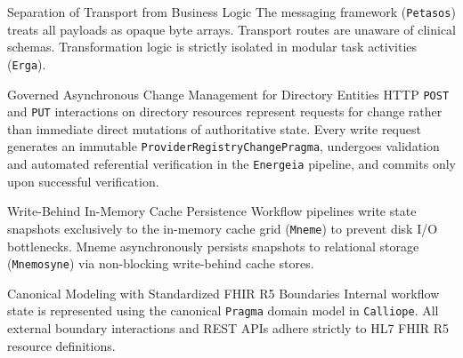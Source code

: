 \begin{principlebox}{Separation of Transport from Business Logic}
The messaging framework (\texttt{Petasos}) treats all payloads as opaque byte arrays. Transport routes are unaware of clinical schemas. Transformation logic is strictly isolated in modular task activities (\texttt{Erga}).
\end{principlebox}

\begin{principlebox}{Governed Asynchronous Change Management for Directory Entities}
HTTP \texttt{POST} and \texttt{PUT} interactions on directory resources represent requests for change rather than immediate direct mutations of authoritative state. Every write request generates an immutable \texttt{ProviderRegistryChangePragma}, undergoes validation and automated referential verification in the \texttt{Energeia} pipeline, and commits only upon successful verification.
\end{principlebox}

\begin{principlebox}{Write-Behind In-Memory Cache Persistence}
Workflow pipelines write state snapshots exclusively to the in-memory cache grid (\texttt{Mneme}) to prevent disk I/O bottlenecks. Mneme asynchronously persists snapshots to relational storage (\texttt{Mnemosyne}) via non-blocking write-behind cache stores.
\end{principlebox}

\begin{principlebox}{Canonical Modeling with Standardized FHIR R5 Boundaries}
Internal workflow state is represented using the canonical \texttt{Pragma} domain model in \texttt{Calliope}. All external boundary interactions and REST APIs adhere strictly to HL7 FHIR R5 resource definitions.
\end{principlebox}


